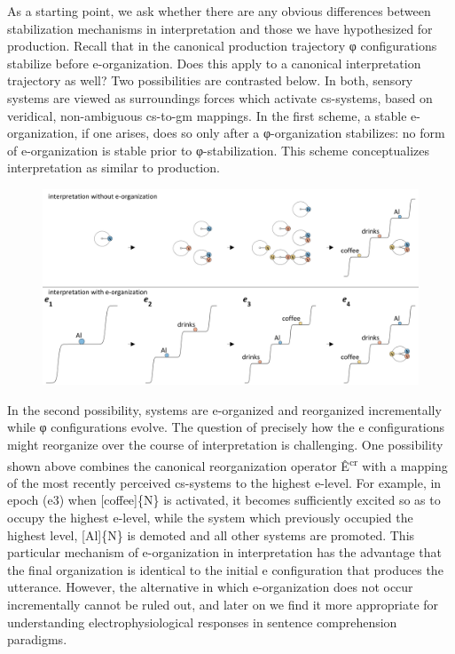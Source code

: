   As a starting point, we ask whether there are any obvious differences between stabilization mechanisms in interpretation and those we have hypothesized for production. Recall that in the canonical production trajectory φ configurations stabilize before e-organization. Does this apply to a canonical interpretation trajectory as well? Two possibilities are contrasted below. In both, sensory systems are viewed as surroundings forces which activate cs-systems, based on veridical, non-ambiguous cs-to-gm mappings. In the first scheme, a stable e-organization, if one arises, does so only after a φ-organization stabilizes: no form of e-organization is stable prior to φ-stabilization. This scheme conceptualizes interpretation as similar to production.

  
\begin{figure}
\includegraphics[width=\textwidth]{figures/Tilsen-img90.png}
\caption{\missingcaption}
\label{fig:4:40}
\end{figure}
 

  In the second possibility, systems are e-organized and reorganized incrementally while φ configurations evolve. The question of precisely how the e configurations might reorganize over the course of interpretation is challenging. One possibility shown above combines the canonical reorganization operator Ê\textsuperscript{cr} with a mapping of the most recently perceived cs-systems to the highest e-level. For example, in epoch (e3) when [coffee]\{N\} is activated, it becomes sufficiently excited so as to occupy the highest e-level, while the system which previously occupied the highest level, [Al]\{N\} is demoted and all other systems are promoted. This particular mechanism of e-organization in interpretation has the advantage that the final organization is identical to the initial e configuration that produces the utterance. However, the alternative in which e-organization does not occur incrementally cannot be ruled out, and later on we find it more appropriate for understanding electrophysiological responses in sentence comprehension paradigms.

